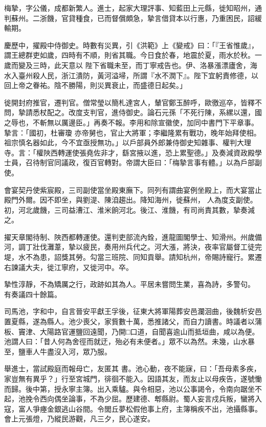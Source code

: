 \begin{pinyinscope}
 梅摯，字公儀，成都新繁人。進士，起家大理評事、知藍田上元縣，徙知昭州，通判蘇州。二浙饑，官貸種食，已而督償頗急，摯言借貸本以行惠，乃重困民，詔緩輸期。



 慶歷中，擢殿中侍御史。時數有災異，引《洪範》上《變戒》曰：「『王省惟歲』，謂王總群吏如歲，四時有不順，則省其職。今日食於春，地震於夏，雨水於秋。一歲而變及三時，此天意以
 陛下省職未至，而丁寧戒告也。伊、洛暴漲漂廬舍，海水入臺州殺人民，浙江潰防，黃河溢埽，所謂『水不潤下』。陛下宜躬責修德，以回上帝之眷祐。陰不勝陽，則災異衰止，而盛德日起矣。」



 徙開封府推官，遷判官。僧常瑩以簡札達宮人，輦官鄭玉醉呼，歐徼巡卒，皆釋不問，摯請悉杖配之。改度支判官，進侍御史。論石元孫「不死行陳，系縲以還，國之辱也，不斬無以厲邊臣。」再奏不報。李用和除宣徽使，加同中書門下平章事。摯言：「國初，杜審瓊
 亦帝舅也，官止大將軍；李繼隆累有戰功，晚年始拜使相。祖宗慎名器如此，今不宜亟授無功。」以戶部員外郎兼侍御史知雜事、權判大理寺。言：「權陜西轉運使張堯佐非才，繇宮掖以進，恐上累聖德。」及奏減資政殿學士員，召待制官同議政，復百官轉對。帝謂大臣曰：「梅摯言事有體。」以為戶部副使。



 會宴契丹使紫宸殿，三司副使當坐殿東廡下。同列有謂曲宴例坐殿上，而大宴當止殿門外爾。因不即坐，與劉湜、陳洎趨出。降知海州，徙蘇州，
 人為度支副使。初，河北歲饑，三司益漕江、淮米餉河北。後江、淮饑，有司尚責其數，摯奏減之。



 擢天章閣待制、陜西都轉運使。還判吏部流內銓，進龍圖閣學士、知滑州。州歲備河，調丁壯伐灘葦，摯以疲民，奏用州兵代之。河大漲，將決，夜率官屬督工徒完堤，水不為患，詔獎其勞。勾當三班院、同知貢舉。請知杭州，帝賜詩寵行。累遷右諫議大夫，徙江寧府，又徙河中。卒。



 摯性淳靜，不為矯厲之行，政跡如其為人。平居未嘗問生業，喜為詩，多警句。
 有奏議四十餘篇。



 司馬池，字和中，自言晉安平獻王孚後，征東大將軍陽葬安邑瀾洄曲，後魏析安邑置夏縣，遂為縣人。池少喪父，家貲數十萬，悉推諸父，而自力讀書。時議者以蒲板、竇津、大陽路官運鹽回遠聞，乃開□口道，自聞喜逾山而抵垣曲，咸以為便。池謂人曰：「昔人何為舍徑而就迂，殆必有未便者。」眾不以為然。未幾，山水暴至，鹽車人牛盡沒入河，眾乃服。



 舉進士，當試殿庭而報母亡，友匿其
 書。池心動，夜不能寐，曰：「吾母素多疾，家豈無有異乎？」行至宮城門，徘徊不能入。因語其友，而友止以母疾告，遂號慟而歸。後中第，授永寧主簿。出入乘驢。與令相惡，池以公事謁令，令南向踞坐不起，池挽令西向偶坐論事，不為少屈。歷建德、郫縣尉。蜀人妄言戍兵叛，蠻將入寇，富人爭瘞金銀逃山谷間。令閭丘夢松假他事上府，主簿稱疾不出，池攝縣事。會上元張燈，乃縱民游觀，凡三夕，民心遂安。




\end{pinyinscope}
